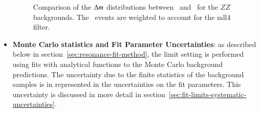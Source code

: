 \begin{itemize}
\begin{figure}[h]
{			
		}
		\caption{Comparison of the $\Delta m$ distributions between \powheg\ and \sherpa\ for the $ZZ$ backgrounds. The \powheg\ events are weighted to account for the mll4 filter.}
		\label{fig:systematic-ZZ-shape}
	\end{figure}
	

	\item \textbf{Monte Carlo statistics and Fit Parameter Uncertainties}: as described below in section~\ref{sec:resonance-fit-method}, the limit setting is performed using fits with analytical functions to the Monte Carlo background predictions. The uncertainty due to the finite statistics of the background samples is in represented in the uncertainties on the fit parameters. This uncertainty is discussed in more detail in section~\ref{sec:fit-limits-systematic-uncertainties}.



\end{itemize}
